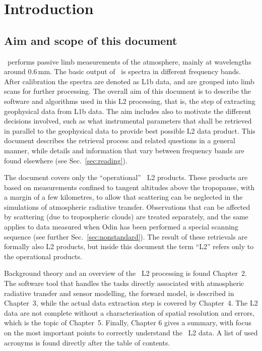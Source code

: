 \chapter{Introduction}
\label{chapter:introduction}

\setcounter{page}{1}


\section{Aim and scope of this document}
\label{sec:aim}
%
\smr\ performs passive limb measurements of the atmosphere, mainly at wavelengths
around 0.6\,mm. The basic output of \smr\ is spectra in different frequency
bands. After calibration the spectra are denoted as L1b data, and are grouped
into limb scans for further processing. The overall aim of this document is to
describe the software and algorithms used in this L2 processing, that is, the
step of extracting geophysical data from L1b data. The aim includes also to
motivate the different decisions involved, such as what instrumental parameters
that shall be retrieved in parallel to the geophysical data to provide best
possible L2 data product. This document describes the retrieval process and
related questions in a general manner, while details and information that
vary between frequency bands are found elsewhere (see
Sec.~\ref{sec:reading}).

The document covers only the ``operational'' \smr\ L2 products. These products
are based on measurements confined to tangent altitudes above the tropopause,
with a margin of a few kilometres, to
allow that scattering can be neglected in the simulations of atmospheric
radiative transfer. Observations that can be affected by scattering (due to
tropospheric clouds) are treated separately, and the same applies to data
measured when Odin has been performed a special scanning sequence (see further
Sec.~\ref{sec:nonstandard}). The result of these retrievals are formally also
L2 products, but inside this document the term ``L2'' refers only to the
operational products.

Background theory and an overview of the \smr\ L2 processing is found
Chapter~2. The software tool that handles the tasks directly associated with
atmospheric radiative transfer and sensor modelling, the forward model, is
described in Chapter~3, while the actual data extraction step is covered by
Chapter~4. The L2 data are not complete without a characterisation of
spatial resolution and errors, which is the topic of Chapter~5. Finally,
Chapter 6 gives a summary, with focus on the most important points to correctly
understand the \smr\ L2 data. A list of used acronyms is found directly after
the table of contents.




